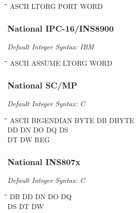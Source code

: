 {\tt\begin{tabbing}
\hspace{3cm}\=\hspace{3cm}\=\hspace{3cm}\=\hspace{3cm}\=\kill
ASCII      \> LTORG       \> PORT        \> WORD \\
\end{tabbing}}

\subsubsection{National IPC-16/INS8900}

{\em Default Integer Syntax: IBM}

{\tt\begin{tabbing}
\hspace{3cm}\=\hspace{3cm}\=\hspace{3cm}\=\hspace{3cm}\=\kill
ASCII      \> ASSUME      \> LTORG       \> WORD \\
\end{tabbing}}

\subsubsection{National SC/MP}

{\em Default Integer Syntax: C}

{\tt\begin{tabbing}
\hspace{3cm}\=\hspace{3cm}\=\hspace{3cm}\=\hspace{3cm}\=\kill
ASCII      \> BIGENDIAN  \> BYTE        \> DB          \> DBYTE \\
DD         \> DN         \> DO          \> DQ          \> DS \\
DT         \> DW         \> REG \\
\end{tabbing}}
	
\subsubsection{National INS807x}

{\em Default Integer Syntax: C}

{\tt\begin{tabbing}
\hspace{3cm}\=\hspace{3cm}\=\hspace{3cm}\=\hspace{3cm}\=\kill
DB         \> DD          \> DN          \> DO         \> DQ \\
DS         \> DT          \> DW \\
\end{tabbing}}
        
